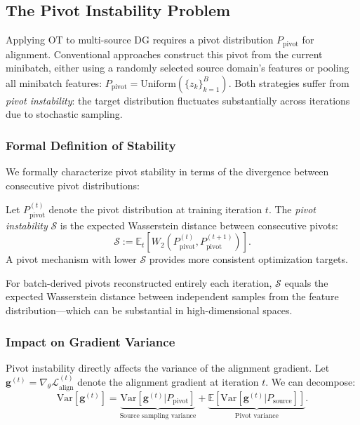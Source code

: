 \subsection{The Pivot Instability Problem}
\label{ssec:pivot_instability}

Applying OT to multi-source DG requires a pivot distribution $P_{\text{pivot}}$ for alignment. Conventional approaches construct this pivot from the current minibatch, either using a randomly selected source domain's features or pooling all minibatch features: $P_{\text{pivot}} = \text{Uniform}(\{z_k\}_{k=1}^{B})$. Both strategies suffer from \textit{pivot instability}: the target distribution fluctuates substantially across iterations due to stochastic sampling.

\subsubsection{Formal Definition of Stability}

We formally characterize pivot stability in terms of the divergence between consecutive pivot distributions:

\begin{definition}
\label{def:stability}
Let $P_{\text{pivot}}^{(t)}$ denote the pivot distribution at training iteration $t$. The \textit{pivot instability} $\mathcal{S}$ is the expected Wasserstein distance between consecutive pivots:
\begin{equation}
    \mathcal{S} := \mathbb{E}_t\left[W_2\left(P_{\text{pivot}}^{(t)}, P_{\text{pivot}}^{(t+1)}\right)\right].
\end{equation}
A pivot mechanism with lower $\mathcal{S}$ provides more consistent optimization targets.
\end{definition}

For batch-derived pivots reconstructed entirely each iteration, $\mathcal{S}$ equals the expected Wasserstein distance between independent samples from the feature distribution—which can be substantial in high-dimensional spaces.

\subsubsection{Impact on Gradient Variance}

Pivot instability directly affects the variance of the alignment gradient. Let $\mathbf{g}^{(t)} = \nabla_\theta \mathcal{L}_{\text{align}}^{(t)}$ denote the alignment gradient at iteration $t$. We can decompose:
\begin{equation}
    \text{Var}[\mathbf{g}^{(t)}] = \underbrace{\text{Var}[\mathbf{g}^{(t)} | P_{\text{pivot}}]}_{\text{Source sampling variance}} + \underbrace{\mathbb{E}[\text{Var}[\mathbf{g}^{(t)} | P_{\text{source}}]]}_{\text{Pivot variance}}.
\end{equation}


